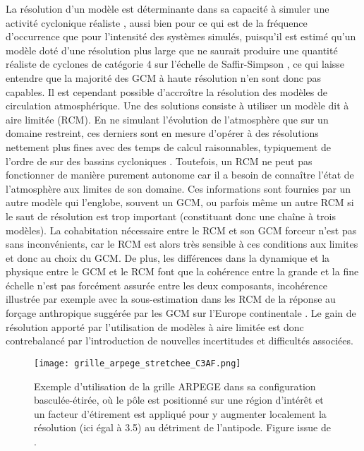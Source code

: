 \documentclass[../main.tex]{subfiles}
\begin{document}
La résolution d'un modèle est déterminante dans sa capacité à simuler une activité cyclonique réaliste \parencite{roberts_impact_2020}, aussi bien pour ce qui
est de la fréquence d'occurrence que pour l'intensité des systèmes simulés, puisqu'il est estimé qu'un modèle doté d'une résolution plus large que  ne
saurait produire une quantité réaliste de cyclones de catégorie 4 sur l'échelle de Saffir-Simpson \parencite{davis_resolving_2018}, ce qui laisse entendre que
la majorité des GCM à haute résolution n'en sont donc pas capables. Il est cependant possible d'accroître la résolution des modèles de circulation
atmosphérique. Une des solutions consiste à utiliser un modèle dit à aire limitée (RCM). En ne simulant l'évolution de l'atmosphère que sur un domaine
restreint, ces derniers sont en mesure d'opérer à des résolutions nettement plus fines avec des temps de calcul raisonnables, typiquement de l'ordre de 
sur des bassins cycloniques \parencite{redmond_projected_2015,gallo_highresolution_2019,torres-alavez_future_2021}. Toutefois, un RCM ne peut pas fonctionner de
manière purement autonome car il a besoin de connaître l'état de l'atmosphère aux limites de son domaine. Ces informations sont fournies par un autre modèle qui
l'englobe, souvent un GCM, ou parfois même un autre RCM si le saut de résolution est trop important (constituant donc une chaîne à trois modèles). La
cohabitation nécessaire entre le RCM et son GCM forceur n'est pas sans inconvénients, car le RCM est alors très sensible à ces conditions aux limites
\parencite{wu_estimating_2005} et donc au choix du GCM. De plus, les différences dans la dynamique et la physique entre le GCM et le RCM font que la cohérence
entre la grande et la fine échelle n'est pas forcément assurée entre les deux composants, incohérence illustrée par exemple avec la sous-estimation dans les RCM
de la réponse au forçage anthropique suggérée par les GCM sur l'Europe continentale \parencite{boe_large_2020,taranu_mechanisms_2023}. Le gain de résolution
apporté par l'utilisation de modèles à aire limitée est donc contrebalancé par l'introduction de nouvelles incertitudes et difficultés associées.

\begin{figure}[tb]
    \centering
    \texttt{[image: grille\_arpege\_stretchee\_C3AF.png]}
    \caption{Exemple d'utilisation de la grille ARPEGE dans sa configuration basculée-étirée, où le pôle est positionné sur une région d'intérêt et un facteur
    d'étirement est appliqué pour y augmenter localement la résolution (ici égal à \num{3.5}) au détriment de l'antipode. Figure issue de
    \cite{chauvin_future_2020}.}
    \label{fig:rotated_streched}
\end{figure}
\end{document}
